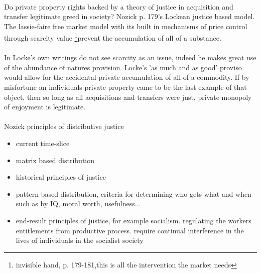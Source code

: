 \paragraph{}Do private property rights backed by a theory of justice in acquisition and transfer legitimate greed in society? Nozick p. 179's Lockean justice based model. The lassie-faire free market model with its built in mechanisms of price control through scarcity value \footnote{invisible hand, p. 179-181,this is all the intervention the market needs}prevent the accumulation of all of a substance.

\paragraph{}In Locke's own writings do not see scarcity as an issue, indeed he makes great use of the abundance of natures provision. Locke's 'as much and as good' proviso would allow for the accidental private accumulation of all of a commodity. If by misfortune an individuals private property came to be the last example of that object, then so long as all acquisitions and transfers were just, private monopoly of enjoyment is legitimate.

\paragraph{}Nozick principles of distributive justice
\begin{itemize}
\item current time-slice
\item matrix based distribution
\item historical principles of justice
\item pattern-based distribution, criteria for determining who gets what and when such as by IQ, moral worth, usefulness...
\item end-result principles of justice, for example socialism. regulating the workers entitlements from productive process. require continual interference in the lives of individuals in the socialist society
\end{itemize}